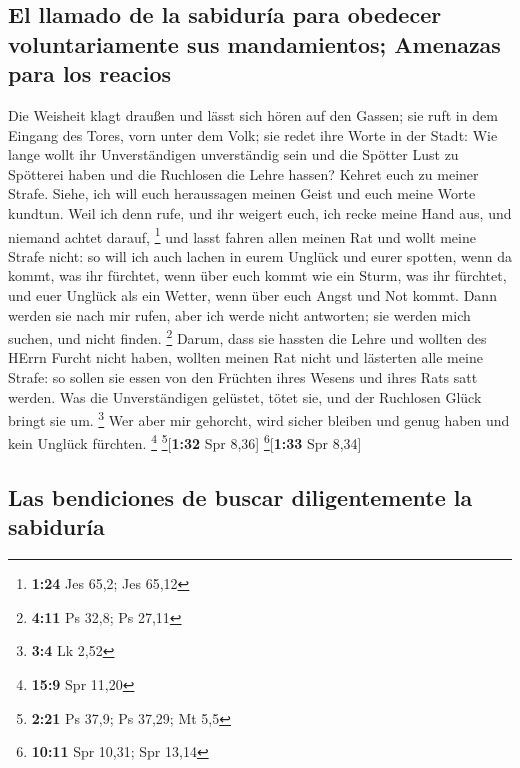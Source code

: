 \hypertarget{el-llamado-de-la-sabiduruxeda-para-obedecer-voluntariamente-sus-mandamientos-amenazas-para-los-reacios}{%
\subsection{El llamado de la sabiduría para obedecer voluntariamente sus
mandamientos; Amenazas para los
reacios}\label{el-llamado-de-la-sabiduruxeda-para-obedecer-voluntariamente-sus-mandamientos-amenazas-para-los-reacios}}

 Die Weisheit klagt draußen und lässt sich hören auf den
Gassen;  sie ruft in dem Eingang des Tores, vorn unter
dem Volk; sie redet ihre Worte in der Stadt:  Wie lange
wollt ihr Unverständigen unverständig sein und die Spötter Lust zu
Spötterei haben und die Ruchlosen die Lehre hassen? 
Kehret euch zu meiner Strafe. Siehe, ich will euch heraussagen meinen
Geist und euch meine Worte kundtun.  Weil ich denn rufe,
und ihr weigert euch, ich recke meine Hand aus, und niemand achtet
darauf, \footnote{\textbf{1:24} Jes 65,2; Jes 65,12}  und
lasst fahren allen meinen Rat und wollt meine Strafe nicht:
 so will ich auch lachen in eurem Unglück und eurer
spotten, wenn da kommt, was ihr fürchtet,  wenn über euch
kommt wie ein Sturm, was ihr fürchtet, und euer Unglück als ein Wetter,
wenn über euch Angst und Not kommt.  Dann werden sie nach
mir rufen, aber ich werde nicht antworten; sie werden mich suchen, und
nicht finden. \footnote{\textbf{4:11} Ps 32,8; Ps 27,11} 
Darum, dass sie hassten die Lehre und wollten des HErrn Furcht nicht
haben,  wollten meinen Rat nicht und lästerten alle meine
Strafe:  so sollen sie essen von den Früchten ihres
Wesens und ihres Rats satt werden.  Was die
Unverständigen gelüstet, tötet sie, und der Ruchlosen Glück bringt sie
um. \footnote{\textbf{3:4} Lk 2,52}  Wer aber mir
gehorcht, wird sicher bleiben und genug haben und kein Unglück fürchten.
\footnote{\textbf{15:9} Spr 11,20} \footnote{\textbf{2:21} Ps 37,9; Ps
  37,29; Mt 5,5}{[}\textbf{1:32} Spr 8,36{]} \footnote{\textbf{10:11}
  Spr 10,31; Spr 13,14}{[}\textbf{1:33} Spr 8,34{]}

\hypertarget{las-bendiciones-de-buscar-diligentemente-la-sabiduruxeda}{%
\subsection{Las bendiciones de buscar diligentemente la
sabiduría}\label{las-bendiciones-de-buscar-diligentemente-la-sabiduruxeda}}

